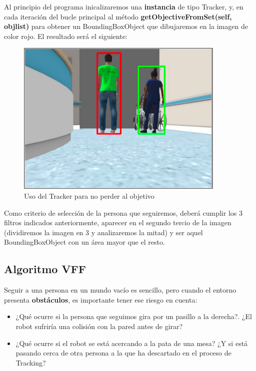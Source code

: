 Al principio del programa inicalizaremos una \textbf{instancia} de tipo Tracker, y, en cada iteración del bucle principal al método \textbf{getObjectiveFromSet(self, objlist)} para obtener un BoundingBoxObject que dibujaremos en la imagen de color rojo. El resultado será el siguiente:

\begin{figure} [H]
  \begin{center}
    \includegraphics[width=10cm]{imagenes/aplicando-tracker.png}
  \end{center}
  \caption[Usando el Tracker para no perder al objetivo]{Uso del Tracker para no perder al objetivo}
  \label{fig:uso_tracker}
\end{figure}

Como criterio de selección de la persona que seguiremos, deberá cumplir los 3 filtros indicados anteriormente, aparecer en el segundo tercio de la imagen (dividiremos la imagen en 3 y analizaremos la mitad) y ser aquel BoundingBoxObject con un área mayor que el resto.\\


\subsection{Algoritmo VFF}
\label{subsec:vff}

Seguir a una persona en un mundo vacío es sencillo, pero cuando el entorno presenta \textbf{obstáculos}, es importante tener ese riesgo en cuenta:

\begin{itemize}
	\item ¿Qué ocurre si la persona que seguimos gira por un pasillo a la derecha?. ¿El robot sufriría una colisión con la pared antes de girar?
	\item ¿Qué ocurre si el robot se está acercando a la pata de una mesa? ¿Y si está pasando cerca de otra persona a la que ha descartado en el proceso de Tracking?
\end{itemize}

